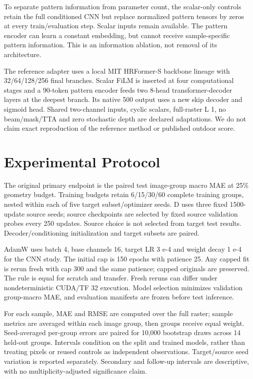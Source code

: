 \documentclass[conference]{IEEEtran}
\begin{document}
To separate pattern information from parameter count, the scalar-only controls retain the full conditioned CNN but replace normalized pattern tensors by zeros at every train/evaluation step. Scalar inputs remain available. The pattern encoder can learn a constant embedding, but cannot receive sample-specific pattern information. This is an information ablation, not removal of its architecture.

The reference adapter uses a local MIT HRFormer-S backbone lineage with 32/64/128/256 final branches. Scalar FiLM is inserted at four computational stages and a 90-token pattern encoder feeds two 8-head transformer-decoder layers at the deepest branch. Its native 500 output uses a new skip decoder and sigmoid head. Shared two-channel inputs, cyclic scalars, full-raster L 1, no beam/mask/TTA and zero stochastic depth are declared adaptations. We do not claim exact reproduction of the reference method or published outdoor score.

\section{Experimental Protocol}
The original primary endpoint is the paired test image-group macro MAE at 25\% geometry budget. Training budgets retain 6/15/30/60 complete training groups, nested within each of five target subset/optimizer seeds. D uses three fixed 1500-update source seeds; source checkpoints are selected by fixed source validation probes every 250 updates. Source choice is not selected from target test results. Decoder/conditioning initialization and target subsets are paired.

AdamW uses batch 4, base channels 16, target LR 3 e-4 and weight decay 1 e-4 for the CNN study. The initial cap is 150 epochs with patience 25. Any capped fit is rerun fresh with cap 300 and the same patience; capped originals are preserved. The rule is equal for scratch and transfer. Fresh reruns can differ under nondeterministic CUDA/TF 32 execution. Model selection minimizes validation group-macro MAE, and evaluation manifests are frozen before test inference.

For each sample, MAE and RMSE are computed over the full raster; sample metrics are averaged within each image group, then groups receive equal weight. Seed-averaged per-group errors are paired for 10,000 bootstrap draws across 14 held-out groups. Intervals condition on the split and trained models, rather than treating pixels or reused controls as independent observations. Target/source seed variation is reported separately. Secondary and follow-up intervals are descriptive, with no multiplicity-adjusted significance claim.
\end{document}
